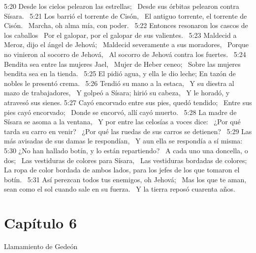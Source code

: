 5:20 Desde los cielos pelearon las estrellas;  
Desde sus órbitas pelearon contra Sísara.  
5:21 Los barrió el torrente de Cisón,  
El antiguo torrente, el torrente de Cisón.  
Marcha, oh alma mía, con poder.  
5:22 Entonces resonaron los cascos de los caballos  
Por el galopar, por el galopar de sus valientes.  
5:23 Maldecid a Meroz, dijo el ángel de Jehová;  
Maldecid severamente a sus moradores,  
Porque no vinieron al socorro de Jehová,  
Al socorro de Jehová contra los fuertes.  
5:24 Bendita sea entre las mujeres Jael,  
Mujer de Heber ceneo;  
Sobre las mujeres bendita sea en la tienda.  
5:25 El pidió agua, y ella le dio leche; 
En tazón de nobles le presentó crema.  
5:26 Tendió su mano a la estaca,  
Y su diestra al mazo de trabajadores,  
Y golpeó a Sísara; hirió su cabeza,  
Y le horadó, y atravesó sus sienes. 
5:27 Cayó encorvado entre sus pies, quedó tendido;  
Entre sus pies cayó encorvado;  
Donde se encorvó, allí cayó muerto.  
5:28 La madre de Sísara se asoma a la ventana,  
Y por entre las celosías a voces dice:  
¿Por qué tarda su carro en venir?  
¿Por qué las ruedas de sus carros se detienen?  
5:29 Las más avisadas de sus damas le respondían,  
Y aun ella se respondía a sí misma:  
5:30 ¿No han hallado botín, y lo están repartiendo?  
A cada uno una doncella, o dos;  
Las vestiduras de colores para Sísara,  
Las vestiduras bordadas de colores;  
La ropa de color bordada de ambos lados, para los jefes de los que tomaron el botín.  
5:31 Así perezcan todos tus enemigos, oh Jehová;  
Mas los que te aman, sean como el sol cuando sale en su fuerza.  
Y la tierra reposó cuarenta años.  
\section*{Capítulo 6}
Llamamiento de Gedeón  

